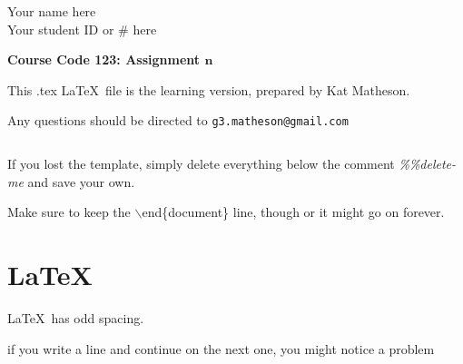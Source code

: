\documentclass[11pt, oneside]{article}   	%
\begin{document}
 \pagestyle{empty}

\begin{flushright}
Your name here
\\
Your student ID or \# here
\end{flushright}

\vspace{12pt}

\begin{center}
\textbf{\Large{Course Code 123: Assignment $\mathbf{n}$}}
\end{center}

\vspace{24pt}


This .tex \LaTeX \ file is the learning version, prepared by Kat Matheson.

Any questions should be directed to \texttt{g3.matheson@gmail.com}

$\ $

If you lost the template, simply delete everything below the comment \emph{\%\%delete-me} and save your own.

Make sure to keep the $\backslash$end\{document\} line, though or it might go on forever.

\newpage %

\tableofcontents %

\newpage

\section{\LaTeX} \noindent

\LaTeX \ has odd spacing.

if you write a line
and continue on the next one, you might notice a problem
\end{document}
